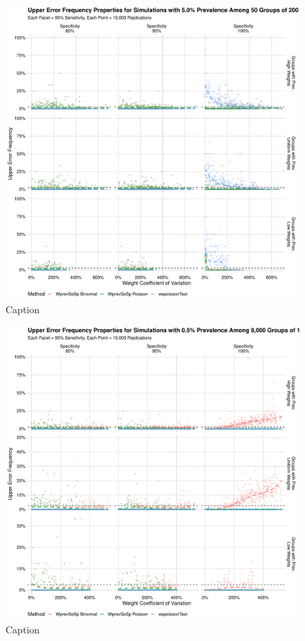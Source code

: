 \documentclass[AMA,STIX1COL]{WileyNJD-v2}
\begin{document}
\begin{figure}
\centering
\includegraphics[width=\textwidth]{figures/imperfect_upper_error_frequency_50_groups_0_05_prev.pdf}
\caption{Caption}
\label{fig:imperfect_upper_error_frequency_50_groups_0_05_prev}
\end{figure}

\begin{figure}
\centering
\includegraphics[width=\textwidth]{figures/imperfect_upper_error_frequency_8000_groups_0_005_prev.pdf}
\caption{Caption}
\label{fig:imperfect_upper_error_frequency_8000_groups_0_005_prev}
\end{figure}
\end{document}
